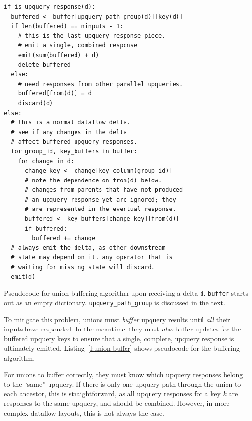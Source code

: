 \begin{listing}
  \begin{verbatim}
if is_upquery_response(d):
  buffered <- buffer[upquery_path_group(d)][key(d)]
  if len(buffered) == ninputs - 1:
    # this is the last upquery response piece.
    # emit a single, combined response
    emit(sum(buffered) + d)
    delete buffered
  else:
    # need responses from other parallel upqueries.
    buffered[from(d)] = d
    discard(d)
else:
  # this is a normal dataflow delta.
  # see if any changes in the delta
  # affect buffered upquery responses.
  for group_id, key_buffers in buffer:
    for change in d:
      change_key <- change[key_column(group_id)]
      # note the dependence on from(d) below.
      # changes from parents that have not produced
      # an upquery response yet are ignored; they
      # are represented in the eventual response.
      buffered <- key_buffers[change_key][from(d)]
      if buffered:
        buffered += change
  # always emit the delta, as other downstream
  # state may depend on it. any operator that is
  # waiting for missing state will discard.
  emit(d)
  \end{verbatim}
  \caption{Pseudocode for union buffering algorithm upon receiving a delta
  \texttt{d}. \texttt{buffer} starts out as an empty dictionary.
  \texttt{upquery\_path\_group} is discussed in the text.}
  \label{l:union-buffer}
\end{listing}

To mitigate this problem, unions must \textit{buffer} upquery results until
\emph{all} their inputs have responded. In the meantime, they must \emph{also}
buffer updates for the buffered upquery keys to ensure that a single, complete,
upquery response is ultimately emitted. Listing~\vref{l:union-buffer} shows
pseudocode for the buffering algorithm.

For unions to buffer correctly, they must know which upquery responses belong to
the ``same'' upquery. If there is only one upquery path through the union to
each ancestor, this is straightforward, as all upquery responses for a key $k$
are responses to the same upquery, and should be combined. However, in more
complex dataflow layouts, this is not always the case.

